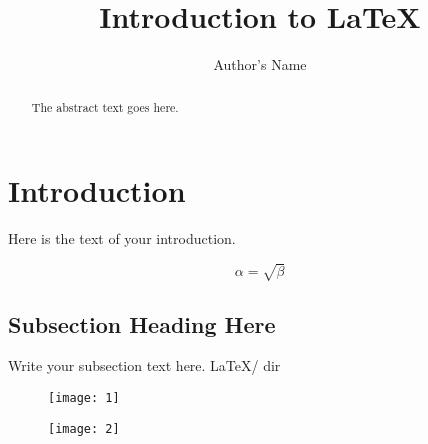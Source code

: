 \documentclass{article}
\begin{document}
	\title{Introduction to \LaTeX{}}
	\author{Author's Name}

	\maketitle

	\begin{abstract}
		The abstract text goes here.
	\end{abstract}

	\section{Introduction}
		Here is the text of your introduction.

	\begin{equation}
	    \label{simple_equation}
	    \alpha = \sqrt{ \beta }
	\end{equation}

	\subsection{Subsection Heading Here}
		Write your subsection text here.
		LaTeX/ 
		\jobname\unskip dir

	\begin{figure}
	\centering
	\texttt{[image: 1]}
	\end{figure}


	\begin{figure}
	\centering
	\texttt{[image: 2]}
	\end{figure}
	
\end{document}

